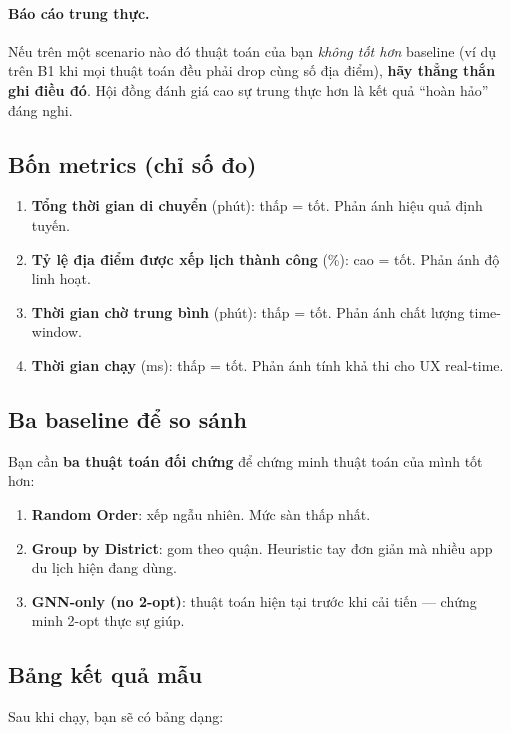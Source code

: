 \documentclass[12pt,a4paper]{report}
\begin{document}
\paragraph{Báo cáo trung thực.} Nếu trên một scenario nào đó thuật toán của bạn \textit{không tốt hơn} baseline (ví dụ trên B1 khi mọi thuật toán đều phải drop cùng số địa điểm), \textbf{hãy thẳng thắn ghi điều đó}. Hội đồng đánh giá cao sự trung thực hơn là kết quả ``hoàn hảo'' đáng nghi.

\subsection{Bốn metrics (chỉ số đo)}

\begin{enumerate}
    \item \textbf{Tổng thời gian di chuyển} (phút): thấp = tốt. Phản ánh hiệu quả định tuyến.
    \item \textbf{Tỷ lệ địa điểm được xếp lịch thành công} (\%): cao = tốt. Phản ánh độ linh hoạt.
    \item \textbf{Thời gian chờ trung bình} (phút): thấp = tốt. Phản ánh chất lượng time-window.
    \item \textbf{Thời gian chạy} (ms): thấp = tốt. Phản ánh tính khả thi cho UX real-time.
\end{enumerate}

\subsection{Ba baseline để so sánh}

Bạn cần \textbf{ba thuật toán đối chứng} để chứng minh thuật toán của mình tốt hơn:

\begin{enumerate}
    \item \textbf{Random Order}: xếp ngẫu nhiên. Mức sàn thấp nhất.
    \item \textbf{Group by District}: gom theo quận. Heuristic tay đơn giản mà nhiều app du lịch hiện đang dùng.
    \item \textbf{GNN-only (no 2-opt)}: thuật toán hiện tại trước khi cải tiến --- chứng minh 2-opt thực sự giúp.
\end{enumerate}

\subsection{Bảng kết quả mẫu}

Sau khi chạy, bạn sẽ có bảng dạng:
\end{document}
